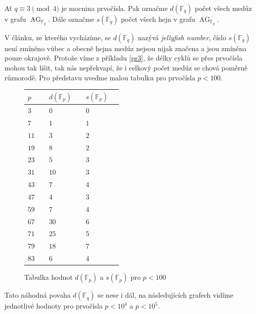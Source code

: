 \documentclass[12pt]{report}
\DeclareMathOperator{\AG}{AG}
\begin{document}
\begin{definice}
Ať $q \equiv 3 \pmod{4}$ je mocnina prvočísla. Pak označme $d(\mathbb{F}_q)$ počet všech medúz v grafu $\AG_{\mathbb{F}_q}$. Dále označme $s(\mathbb{F}_q)$ počet všech hejn v grafu $\AG_{\mathbb{F}_q}$.
\end{definice}

V článku, ze kterého vycházíme, se $d(\mathbb{F}_q)$ nazývá \textit{jellyfish number}, číslo $s(\mathbb{F}_q)$ není zmíněno vůbec a obecně hejna medúz nejsou nijak značena a jsou zmíněna pouze okrajově. Protože víme z příkladu \ref{pr3}, že délky cyklů se přes prvočísla mohou tak lišit, tak nás nepřekvapí, že i celkový počet medúz se chová poměrně různorodě. Pro představu uveďme malou tabulku pro prvočísla $p < 100$.

\begin{figure}[h]
 \begin{longtable}[H]{>{\raggedright\arraybackslash}p{0.15\linewidth}p{0.15\linewidth}p{0.15\linewidth}}
\toprule
$p$ & $d(\mathbb{F}_p)$ & $s(\mathbb{F}_p)$\\
\midrule
$3$ & \noindent $0$ & \noindent $0$\\
$7$ & \noindent $1$ & \noindent $1$\\
$11$ & \noindent $3$ & \noindent $2$\\
$19$ & \noindent $8$ & \noindent $2$\\
$23$ & \noindent $5$ & \noindent $3$\\
$31$ & \noindent $10$ & \noindent $3$\\
$43$ & \noindent $7$ & \noindent $4$\\
$47$ & \noindent $4$ & \noindent $3$\\
$59$ & \noindent $7$ & \noindent $4$\\
$67$ & \noindent $30$ & \noindent $6$\\
$71$ & \noindent $25$ & \noindent $5$\\
$79$ & \noindent $18$ & \noindent $7$\\
$83$ & \noindent $6$ & \noindent $4$\\
\bottomrule 
\end{longtable}
\caption{Tabulka hodnot $d(\mathbb{F}_p)$ a $s(\mathbb{F}_p)$ pro $p < 100$}
\end{figure}


Tato náhodná povaha $d(\mathbb{F}_q)$ se nese i dál, na následujících grafech vidíme jednotlivé hodnoty pro prvočísla $p < 10^4$ a $p < 10^5$.
\end{document}

